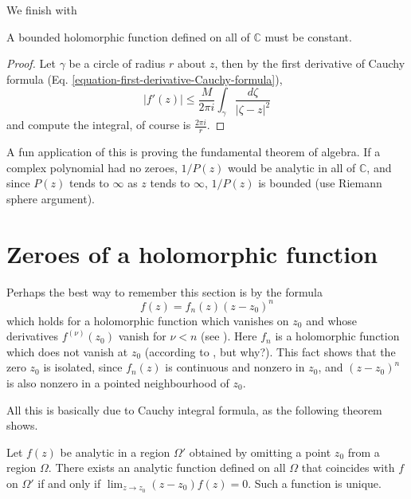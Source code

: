 We finish with

\begin{theorem}[Liouville]
\label{theorem-Liouville}
A bounded holomorphic function defined on all of $\mathbb{C}$ must be constant.
\end{theorem}

\begin{proof}
Let $\gamma$ be a circle of radius $r$ about $z$, then by the first derivative
of Cauchy formula (Eq. \ref{equation-first-derivative-Cauchy-formula}),
$$
|f'(z)|\leq \frac{M}{2\pi i}\int_\gamma \frac{d\zeta}{|\zeta-z|^2}
$$
and compute the integral, of course is $\frac{2\pi i}{r}$.
\end{proof}

\noindent
A fun application of this is proving the fundamental theorem of algebra. If a
complex polynomial had no zeroes, $1/P(z)$ would be analytic in all of
$\mathbb{C}$, and since $P(z)$ tends to $\infty$ as $z$ tends to $\infty$,
$1/P(z)$ is bounded (use Riemann sphere argument).

\section{Zeroes of a holomorphic function}
\label{section-zeroes}

\noindent
Perhaps the best way to remember this section is by the formula
\begin{equation}
\label{equation-zero}
f(z)=f_n(z)(z-z_0)^n
\end{equation}
which holds for a holomorphic function which
vanishes on $z_0$ and whose derivatives $f^{(\nu)}(z_0)$ vanish
for $\nu<n$ (see \cite[p. 126]{Ahlfors}).
Here $f_n$ is a holomorphic function which does not vanish at $z_0$ 
(according to \cite{lec}, but why?).
This fact shows that the zero $z_0$ is isolated,
since $f_n(z)$ is continuous and nonzero in $z_0$,
and $(z-z_0)^n$ is also nonzero in a pointed neighbourhood of $z_0$.

All this is basically due to Cauchy integral formula,
as the following theorem shows.

\begin{theorem}
\label{theorem-removable-singularity}
Let $f(z)$ be analytic in a region $\Omega'$ obtained by omitting a point $z_0$
from a region $\Omega$. There exists an analytic function  defined on all 
$\Omega$ that coincides with $f$ on $\Omega'$ if and only if 
$\lim_{z \to z_0} (z-z_0)f(z)=0$. Such a function is unique.
\end{theorem}

